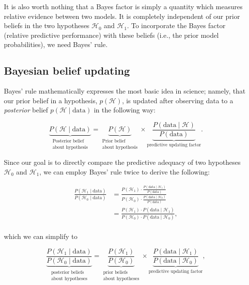 \documentclass[english,,doc,floatsintext]{apa6}
\begin{document}
It is also worth nothing that a Bayes factor is simply a quantity which measures relative evidence between two models. It is completely independent of our prior beliefs in the two hypotheses \(\mathcal{H}_0\) and \(\mathcal{H}_1\). To incorporate the Bayes factor (relative predictive performance) with these beliefs (i.e., the prior model probabilities), we need Bayes' rule.

\hypertarget{bayesian-belief-updating}{%
\subsection{Bayesian belief updating}\label{bayesian-belief-updating}}

Bayes' rule mathematically expresses the most basic idea in science; namely, that our prior belief in a hypothesis, \(p(\mathcal{H})\), is updated after observing data to a \emph{posterior} belief \(p(\mathcal{H}\mid \text{data})\) in the following way:

\[
\underbrace{P(\mathcal{H}\mid \text{data})}_{\substack{\text{Posterior belief}\\ \text{about hypothesis}}} = \underbrace{P(\mathcal{H})}_{\substack{\text{Prior belief}\\ \text{about hypothesis}}} \times \underbrace{\frac{P(\text{data}\mid \mathcal{H})}{P(\text{data})}}_{\text{predictive updating factor}}.
\]

Since our goal is to directly compare the predictive adequacy of two hypotheses \(\mathcal{H}_0\) and \(\mathcal{H}_1\), we can employ Bayes' rule twice to derive the following:

\begin{align*}
  \frac{P(\mathcal{H}_1\mid \text{data})}{P(\mathcal{H}_0\mid \text{data})}
  & = \frac{P(\mathcal{H}_1) \cdot \frac{P(\text{data}\mid \mathcal{H}_1)}{P(\text{data})}}{P(\mathcal{H}_0) \cdot  \frac{P(\text{data}\mid \mathcal{H}_0)}{P(\text{data})}} \\ 
  & = \frac{P(\mathcal{H}_1)\cdot P(\text{data}\mid \mathcal{H}_1)}{P(\mathcal{H}_0)\cdot P(\text{data}\mid \mathcal{H}_0)},\\
\end{align*}

which we can simplify to

\[
\underbrace{\frac{P(\mathcal{H}_1\mid \text{data})}{P(\mathcal{H}_0\mid \text{data})}}_{\substack{\text{posterior beliefs}\\ \text{about hypotheses}}} = \underbrace{\frac{P(\mathcal{H}_1)}{P(\mathcal{H}_0)}}_{\substack{\text{prior beliefs}\\ \text{about hypotheses}}} \times \underbrace{\frac{P(\text{data}\mid \mathcal{H}_1)}{P(\text{data}\mid \mathcal{H}_0)}}_{\text{predictive updating factor}}, 
\]
\end{document}
